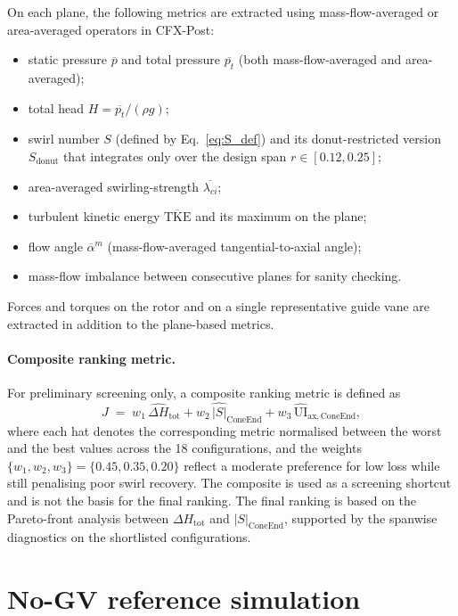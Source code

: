 On each plane, the following metrics are extracted using mass-flow-averaged or area-averaged operators in CFX-Post:
\begin{itemize}
  \item static pressure $\overline{p}$ and total pressure $\overline{p_t}$ (both mass-flow-averaged and area-averaged);
  \item total head $H = \overline{p_t}/(\rho g)$;
  \item swirl number $S$ (defined by Eq.~\ref{eq:S_def}) and its donut-restricted version $S_{\mathrm{donut}}$ that integrates only over the design span $r \in [0.12, 0.25]$;
  \item area-averaged swirling-strength $\overline{\lambda_{ci}}$;
  \item turbulent kinetic energy $\overline{\mathrm{TKE}}$ and its maximum on the plane;
  \item flow angle $\overline{\alpha}^{m}$ (mass-flow-averaged tangential-to-axial angle);
  \item mass-flow imbalance between consecutive planes for sanity checking.
\end{itemize}
Forces and torques on the rotor and on a single representative guide vane are extracted in addition to the plane-based metrics.
 
\paragraph{Composite ranking metric.}
For preliminary screening only, a composite ranking metric is defined as
\begin{equation}
J \;=\; w_1\,\widehat{\Delta H}_{\mathrm{tot}} + w_2\,\widehat{|S|}_{\mathrm{ConeEnd}} + w_3\,\widehat{\mathrm{UI}}_{\mathrm{ax,ConeEnd}},
\label{eq:composite}
\end{equation}
where each hat denotes the corresponding metric normalised between the worst and the best values across the 18 configurations, and the weights $\{w_1, w_2, w_3\} = \{0.45, 0.35, 0.20\}$ reflect a moderate preference for low loss while still penalising poor swirl recovery. The composite is used as a screening shortcut and is not the basis for the final ranking. The final ranking is based on the Pareto-front analysis between $\Delta H_{\mathrm{tot}}$ and $|S|_{\mathrm{ConeEnd}}$, supported by the spanwise diagnostics on the shortlisted configurations.
 
\section{No-GV reference simulation}
\label{sec:methods_rdt_baseline}
 
